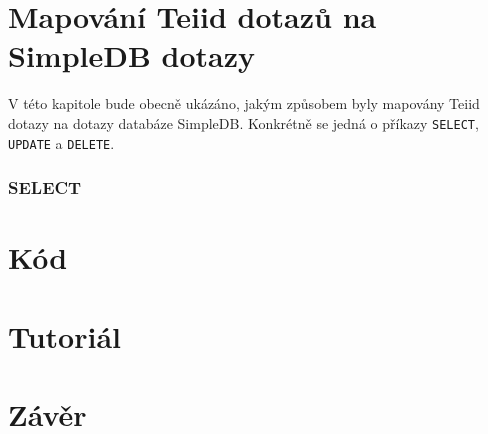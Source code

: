 \documentclass[oneside,11pt]{fithesis2}
\begin{document}
\chapter{Mapování Teiid dotazů na SimpleDB dotazy}
V této kapitole bude obecně ukázáno, jakým způsobem byly mapovány Teiid dotazy na dotazy databáze SimpleDB. Konkrétně se jedná o příkazy \verb<SELECT<, \verb<UPDATE< a \verb<DELETE<.
\subsection*{SELECT}

\chapter{Kód}
\chapter{Tutoriál}
\chapter{Závěr}
\end{document}

